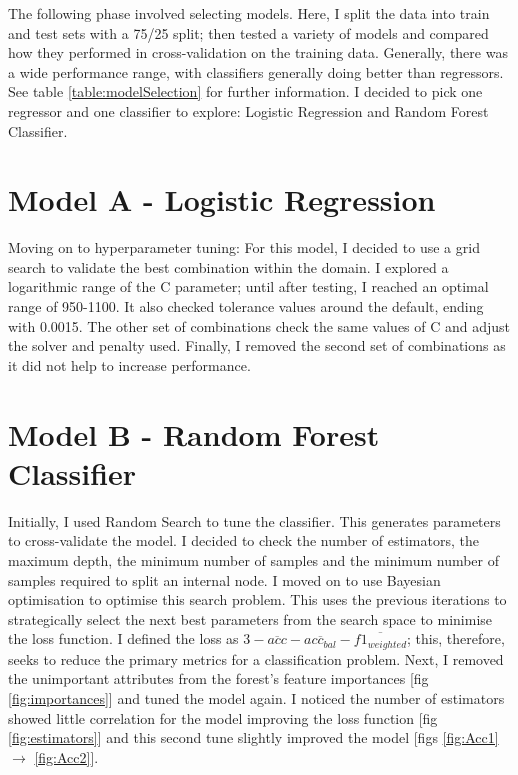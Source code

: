 \documentclass[11pt, a4paper]{article}
\begin{document}
\begin{multicols}{2}
The following phase involved selecting models. Here, I split the data into train and test sets with a 75/25 split; then tested a variety of models and compared how they performed in cross-validation on the training data. 
Generally, there was a wide performance range, with classifiers generally doing better than regressors. See table \ref{table:modelSelection} for further information. I decided to pick one regressor and one classifier to explore: Logistic Regression and Random Forest Classifier.
\vspace{-0.4cm}
\section{Model A - Logistic Regression}

Moving on to hyperparameter tuning: For this model, I decided to use a grid search to validate the best combination within the domain. I explored a logarithmic range of the C parameter; until after testing, I reached an optimal range of 950-1100. It also checked tolerance values around the default, ending with 0.0015.
The other set of combinations check the same values of C and adjust the solver and penalty used. Finally, I removed the second set of combinations as it did not help to increase performance.
\vspace{-0.4cm}
\section{Model B - Random Forest Classifier}

Initially, I used Random Search to tune the classifier. This generates parameters to cross-validate the model.
I decided to check the number of estimators, the maximum depth, the minimum number of samples and the minimum number of samples required to split an internal node.
I moved on to use Bayesian optimisation to optimise this search problem. This uses the previous iterations to strategically select the next best parameters from the search space to minimise the loss function. I defined the loss as $ 3 - \overline{acc} - \overline{acc_{bal}} - \overline{f1_{weighted}}$; this, therefore, seeks to reduce the primary metrics for a classification problem.
Next, I removed the unimportant attributes from the forest's feature importances [fig \ref{fig:importances}] and tuned the model again. I noticed the number of estimators showed little correlation for the model improving the loss function [fig \ref{fig:estimators}] and this second tune slightly improved the model [figs \ref{fig:Acc1} $\to$ \ref{fig:Acc2}].
\vspace{-0.4cm}

\end{multicols}
\end{document}
